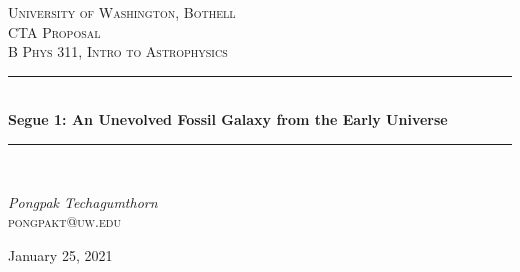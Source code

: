 \begin{titlepage} %
	\newcommand{\HRule}{\rule{\linewidth}{0.5mm}} %
	
	\center %
	
	
	\textsc{\LARGE University of Washington, Bothell}\\[1.5cm] %
	
	\textsc{\Large CTA Proposal}\\[0.5cm] %
	
	\textsc{\large B Phys 311, Intro to Astrophysics}\\[0.5cm] %
	
	
	\HRule\\[0.4cm]
	
	{\huge\bfseries Segue 1: An Unevolved Fossil Galaxy from the Early Universe}\\[0.4cm] %
	
	\HRule\\[1.5cm]
	
	
	\begin{minipage}{0.4\textwidth}
		\begin{flushleft}
			\large
			\textit{Pongpak Techagumthorn}\\
			\textsc{pongpakt@uw.edu} %
		\end{flushleft}
	\end{minipage}
	
	
	\vfill\vfill\vfill %
	
	{\large January 25, 2021} %
	
	\vfill %
	
\end{titlepage}

